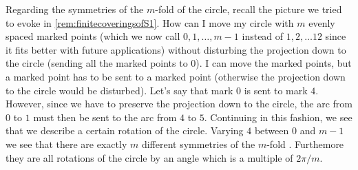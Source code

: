   \begin{remark}
    Regarding the symmetries of the $m$-fold \covering of the circle, recall the picture we tried to evoke in \cref{rem:finitecoveringsofS1}.  How can I move my circle with $m$ evenly spaced marked points  (which we now call $0,1,\dots, m-1$ instead of $1,2,\dots 12$ since it fits better with future applications) without disturbing the projection down to the circle (sending all the marked points to $0$).  I can move the marked points, but a marked point has to be sent to a marked point (otherwise the projection down to the circle would be disturbed).  Let's say that mark $0$ is sent to mark $4$.  However, since we have to preserve the projection down to the circle, the arc from $0$ to $1$ must then be sent to the arc from $4$ to $5$.  Continuing in this fashion, we see that we describe a certain rotation of the circle.  Varying $4$ between $0$ and $m-1$ we see that there are exactly $m$ different symmetries of the $m$-fold \covering.  Furthemore they are all rotations of the circle by an angle which is a multiple of $2\pi/m$.
  \end{remark}


